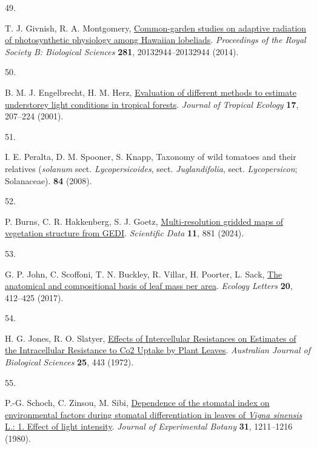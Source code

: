 \documentclass[
  letterpaper,
  DIV=11,
  numbers=noendperiod]{scrartcl}
\newlength{\cslhangindent}
\newlength{\csllabelwidth}
\newenvironment{CSLReferences}[2] %
 {\begin{list}{}{%
  \setlength{\itemindent}{0pt}
  \setlength{\leftmargin}{0pt}
  \setlength{\parsep}{0pt}
  \ifodd #1
   \setlength{\leftmargin}{\cslhangindent}
   \setlength{\itemindent}{-1\cslhangindent}
  \fi
  \setlength{\itemsep}{#2\baselineskip}}}
 {\end{list}}
\newcommand{\CSLLeftMargin}[1]{\parbox[t]{\csllabelwidth}{\strut#1\strut}}
\newcommand{\CSLRightInline}[1]{\parbox[t]{\linewidth - \csllabelwidth}{\strut#1\strut}}
\begin{document}
\begin{CSLReferences}{0}{1}
\CSLLeftMargin{49. }%
\CSLRightInline{T. J. Givnish, R. A. Montgomery,
\href{https://doi.org/10.1098/rspb.2013.2944}{Common-garden studies on
adaptive radiation of photosynthetic physiology among {Hawaiian}
lobeliads}. \emph{Proceedings of the Royal Society B: Biological
Sciences} \textbf{281}, 20132944--20132944 (2014).}

\CSLLeftMargin{50. }%
\CSLRightInline{B. M. J. Engelbrecht, H. M. Herz,
\href{https://doi.org/10.1017/S0266467401001146}{Evaluation of different
methods to estimate understorey light conditions in tropical forests}.
\emph{Journal of Tropical Ecology} \textbf{17}, 207--224 (2001).}

\CSLLeftMargin{51. }%
\CSLRightInline{I. E. Peralta, D. M. Spooner, S. Knapp, Taxonomy of wild
tomatoes and their relatives (\emph{solanum} sect.
\emph{Lycopersicoides}, sect. \emph{Juglandifolia}, sect.
\emph{Lycopersicon}; {Solanaceae}). \textbf{84} (2008).}

\CSLLeftMargin{52. }%
\CSLRightInline{P. Burns, C. R. Hakkenberg, S. J. Goetz,
\href{https://doi.org/10.1038/s41597-024-03668-4}{Multi-resolution
gridded maps of vegetation structure from {GEDI}}. \emph{Scientific
Data} \textbf{11}, 881 (2024).}

\CSLLeftMargin{53. }%
\CSLRightInline{G. P. John, C. Scoffoni, T. N. Buckley, R. Villar, H.
Poorter, L. Sack, \href{https://doi.org/10.1111/ele.12739}{The
anatomical and compositional basis of leaf mass per area}. \emph{Ecology
Letters} \textbf{20}, 412--425 (2017).}

\CSLLeftMargin{54. }%
\CSLRightInline{H. G. Jones, R. O. Slatyer,
\href{https://doi.org/10.1071/BI9720443}{Effects of {Intercellular}
{Resistances} on {Estimates} of the {Intracellular} {Resistance} to
{Co2} {Uptake} by {Plant} {Leaves}}. \emph{Australian Journal of
Biological Sciences} \textbf{25}, 443 (1972).}

\CSLLeftMargin{55. }%
\CSLRightInline{P.-G. Schoch, C. Zinsou, M. Sibi,
\href{https://doi.org/10.1093/jxb/31.5.1211}{Dependence of the stomatal
index on environmental factors during stomatal differentiation in leaves
of \emph{{Vigna} sinensis} {L}.: 1. {Effect} of light intensity}.
\emph{Journal of Experimental Botany} \textbf{31}, 1211--1216 (1980).}


\end{CSLReferences}
\end{document}
